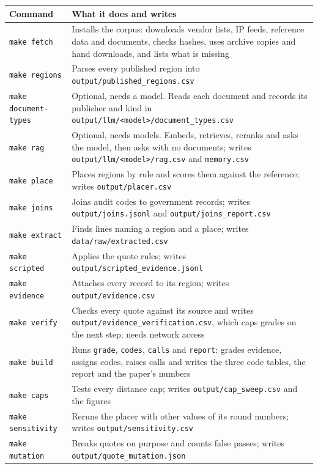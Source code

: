 \documentclass[10pt,twocolumn]{article}
\newcommand{\code}[1]{\texttt{#1}}
\begin{document}
\begin{table}[htbp]
\centering
\small
\begin{tabular}{lp{}}
\toprule
Command & What it does and writes \\
\midrule
\code{make fetch} & Installs the corpus: downloads vendor lists, IP feeds, reference data and documents, checks hashes, uses archive copies and hand downloads, and lists what is missing \\
\code{make regions} & Parses every published region into \code{output/published\_regions.csv} \\
\code{make document-types} & Optional, needs a model. Reads each document and records its publisher and kind in \code{output/llm/<model>/document\_types.csv} \\
\code{make rag} & Optional, needs models. Embeds, retrieves, reranks and asks the model, then asks with no documents; writes \code{output/llm/<model>/rag.csv} and \code{memory.csv} \\
\code{make place} & Places regions by rule and scores them against the reference; writes \code{output/placer.csv} \\
\code{make joins} & Joins audit codes to government records; writes \code{output/joins.jsonl} and \code{output/joins\_report.csv} \\
\code{make extract} & Finds lines naming a region and a place; writes \code{data/raw/extracted.csv} \\
\code{make scripted} & Applies the quote rules; writes \code{output/scripted\_evidence.jsonl} \\
\code{make evidence} & Attaches every record to its region; writes \code{output/evidence.csv} \\
\code{make verify} & Checks every quote against its source and writes \code{output/evidence\_verification.csv}, which caps grades on the next step; needs network access \\
\code{make build} & Runs \code{grade}, \code{codes}, \code{calls} and \code{report}: grades evidence, assigns codes, raises calls and writes the three code tables, the report and the paper's numbers \\
\code{make caps} & Tests every distance cap; writes \code{output/cap\_sweep.csv} and the figures \\
\code{make sensitivity} & Reruns the placer with other values of its round numbers; writes \code{output/sensitivity.csv} \\
\code{make mutation} & Breaks quotes on purpose and counts false passes; writes \code{output/quote\_mutation.json} \\

\end{tabular}
\end{table}
\end{document}
